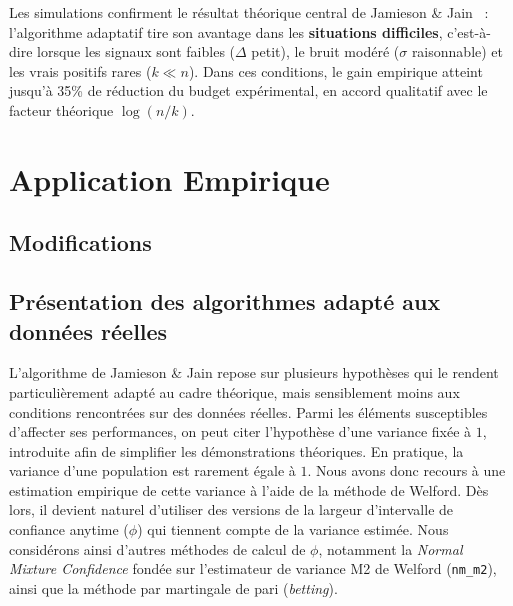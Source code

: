 \documentclass[10.5pt,a4paper]{article}
\begin{document}
Les simulations confirment le résultat théorique central de
Jamieson \& Jain~\cite{jamieson2019} : l'algorithme adaptatif
tire son avantage dans les \textbf{situations difficiles}, c'est-à-dire
lorsque les signaux sont faibles ($\Delta$ petit), le bruit modéré
($\sigma$ raisonnable) et les vrais positifs rares ($k \ll n$). Dans
ces conditions, le gain empirique atteint jusqu'à 35\% de réduction du
budget expérimental, en accord qualitatif avec le facteur théorique
$\log(n/k)$.


\section{Application Empirique}
\label{sec:empirique}


\subsection{Modifications}

\subsection{Présentation des algorithmes adapté aux données réelles}

L'algorithme de Jamieson \& Jain repose sur plusieurs hypothèses qui le rendent particulièrement adapté au cadre théorique, mais sensiblement moins aux conditions rencontrées sur des données réelles.
\newline \newline
Parmi les éléments susceptibles d'affecter ses performances, on peut citer l'hypothèse d'une variance fixée à $1$, introduite afin de simplifier les démonstrations théoriques. En pratique, la variance d'une population est rarement égale à $1$. Nous avons donc recours à une estimation empirique de cette variance à l'aide de la méthode de Welford.
\newline \newline
Dès lors, il devient naturel d'utiliser des versions de la largeur d'intervalle de confiance anytime ($\phi$) qui tiennent compte de la variance estimée. Nous considérons ainsi d'autres méthodes de calcul de $\phi$, notamment la \textit{Normal Mixture Confidence} fondée sur l'estimateur de variance M2 de Welford (\texttt{nm\_m2}), ainsi que la méthode par martingale de pari (\textit{betting}).
\end{document}
